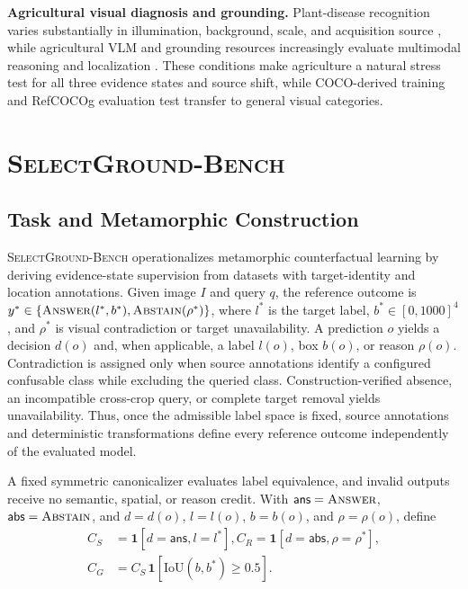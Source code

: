 \documentclass[letterpaper]{article}
\newcommand{\Bench}{\textsc{SelectGround-Bench}\xspace}
\begin{document}
\textbf{Agricultural visual diagnosis and grounding.}
Plant-disease recognition varies substantially in illumination, background, scale, and acquisition source \citep{mohanty2016plantvillage,plantdoc2019,wei2024plantwild}, while agricultural VLM and grounding resources increasingly evaluate multimodal reasoning and localization \citep{agrobench2025,agrigptvl2025,agrogpt2024,grefcw2026,agrovg2026}. These conditions make agriculture a natural stress test for all three evidence states and source shift, while COCO-derived training and RefCOCOg evaluation test transfer to general visual categories.

\section{\Bench}
\label{sec:benchmark}

\subsection{Task and Metamorphic Construction}
\label{sec:task}
\label{sec:transforms}

\Bench operationalizes metamorphic counterfactual learning by deriving evidence-state supervision from datasets with target-identity and location annotations. Given image $I$ and query $q$, the reference outcome is
$y^*\in\{\textsc{Answer}(l^*,b^*),\textsc{Abstain}(\rho^*)\}$, where $l^*$ is the target label, $b^*\in[0,1000]^4$, and $\rho^*$ is visual contradiction or target unavailability. A prediction $o$ yields a decision $d(o)$ and, when applicable, a label $l(o)$, box $b(o)$, or reason $\rho(o)$. Contradiction is assigned only when source annotations identify a configured confusable class while excluding the queried class. Construction-verified absence, an incompatible cross-crop query, or complete target removal yields unavailability. Thus, once the admissible label space is fixed, source annotations and deterministic transformations define every reference outcome independently of the evaluated model.

A fixed symmetric canonicalizer evaluates label equivalence, and invalid outputs receive no semantic, spatial, or reason credit. With $\mathsf{ans}=\textsc{Answer}$, $\mathsf{abs}=\textsc{Abstain}$, and $d=d(o)$, $l=l(o)$, $b=b(o)$, and $\rho=\rho(o)$, define
\begin{equation}
\begin{aligned}
C_S&=\mathbf 1[d=\mathsf{ans},l=l^*],%
C_R=\mathbf 1[d=\mathsf{abs},\rho=\rho^*],\\
C_G&=C_S\,\mathbf 1[\mathrm{IoU}(b,b^*)\geq0.5].
\end{aligned}
\label{eq:correctness}
\end{equation}
\end{document}
